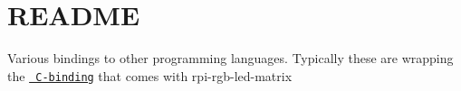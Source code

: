 \chapter{README}
\hypertarget{md_matrix_2bindings_2README}{}\label{md_matrix_2bindings_2README}
Various bindings to other programming languages. Typically these are wrapping the \href{../include/led-matrix-c.h}{\texttt{ C-\/binding}} that comes with rpi-\/rgb-\/led-\/matrix 